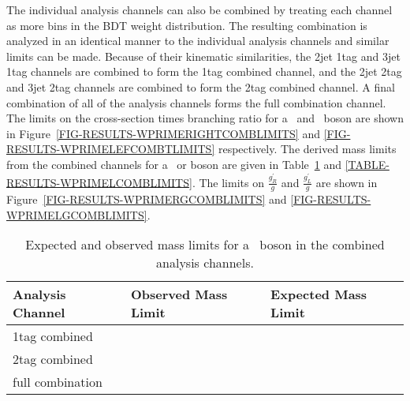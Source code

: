 

The individual analysis channels can also be combined by treating each channel as more bins in the BDT weight distribution. The resulting combination is analyzed in an identical manner to the individual analysis channels and similar limits can be made. Because of their kinematic similarities, the 2jet 1tag and 3jet 1tag channels are combined to form the 1tag combined channel, and the 2jet 2tag and 3jet 2tag channels are combined to form the 2tag combined channel. A final combination of all of the analysis channels forms the full combination channel. The limits on the cross-section times branching ratio for a \WprimeR\ and \WprimeL\ boson are shown in Figure~\ref{FIG-RESULTS-WPRIMERIGHTCOMBLIMITS} and \ref{FIG-RESULTS-WPRIMELEFCOMBTLIMITS} respectively. The derived mass limits from the combined channels for a \WprimeR\ or \WprimeL boson are given in Table~\ref{TABLE-RESULTS-WPRIMERCOMBLIMITS} and \ref{TABLE-RESULTS-WPRIMELCOMBLIMITS}. The limits on $\frac{g^\prime_R}{g}$ and $\frac{g^\prime_L}{g}$ are shown in Figure~\ref{FIG-RESULTS-WPRIMERGCOMBLIMITS} and \ref{FIG-RESULTS-WPRIMELGCOMBLIMITS}.



\begin{table}
\begin{center}
\begin{tabular}{|l|l|l|}
\hline
Analysis Channel & Observed Mass Limit & Expected Mass Limit\\
\hline
1tag combined & & \\
2tag combined & & \\
full combination & & \\
\hline
\end{tabular}
\caption{Expected and observed mass limits for a \WprimeR\ boson in the combined analysis channels.}
\label{TABLE-RESULTS-WPRIMERCOMBLIMITS}
\end{center}
\end{table}


